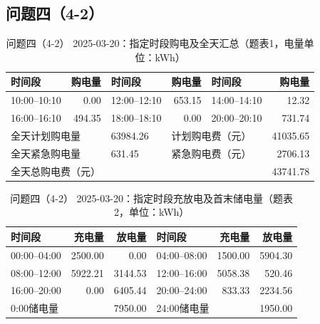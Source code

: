 \FloatBarrier
\clearpage
\subsection{问题四（4-2）}
\begin{table}[H]
\centering\footnotesize
\setlength{\tabcolsep}{4pt}
\caption{问题四（4-2） 2025-03-20：指定时段购电及全天汇总（题表1，电量单位：kWh）}
\label{tab:required-q42-2025-03-20-grid}
\begin{tabular}{@{}lrlrlr@{}}
\toprule
时间段 & 购电量 & 时间段 & 购电量 & 时间段 & 购电量 \\
\midrule
10:00--10:10 & 0.00 & 12:00--12:10 & 653.15 & 14:00--14:10 & 12.32 \\
16:00--16:10 & 494.35 & 18:00--18:10 & 0.00 & 20:00--20:10 & 731.74 \\
\multicolumn{2}{l}{全天计划购电量} & 63984.26 & \multicolumn{2}{l}{计划购电费（元）} & 41035.65 \\
\multicolumn{2}{l}{全天紧急购电量} & 631.45 & \multicolumn{2}{l}{紧急购电费（元）} & 2706.13 \\
\multicolumn{5}{l}{全天总购电费（元）} & 43741.78 \\
\bottomrule
\end{tabular}
\end{table}

\begin{table}[H]
\centering\footnotesize
\setlength{\tabcolsep}{4pt}
\caption{问题四（4-2） 2025-03-20：指定时段充放电及首末储电量（题表2，单位：kWh）}
\label{tab:required-q42-2025-03-20-storage}
\begin{tabular}{@{}lrrlrr@{}}
\toprule
时间段 & 充电量 & 放电量 & 时间段 & 充电量 & 放电量 \\
\midrule
00:00--04:00 & 2500.00 & 0.00 & 04:00--08:00 & 1500.00 & 5904.30 \\
08:00--12:00 & 5922.21 & 3144.53 & 12:00--16:00 & 5058.38 & 520.46 \\
16:00--20:00 & 0.00 & 6405.44 & 20:00--24:00 & 833.33 & 2234.56 \\
\multicolumn{2}{l}{0:00储电量} & 7950.00 & \multicolumn{2}{l}{24:00储电量} & 1950.00 \\
\bottomrule
\end{tabular}
\end{table}

